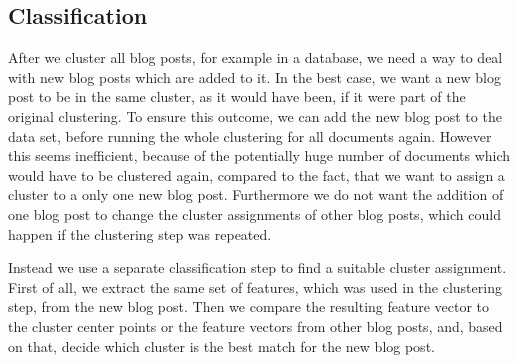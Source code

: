 
\subsection{Classification}
\label{sec:classification}



After we cluster all blog posts, for example in a database, we need a way to deal with new blog posts which are added to it.
In the best case, we want a new blog post to be in the same cluster, as it would have been, if it were part of the original clustering.
To ensure this outcome, we can add the new blog post to the data set, before running the whole clustering for all documents again.
However this seems inefficient, because of the potentially huge number of documents which would have to be clustered again, compared to the fact, that we want to assign a cluster to a only one new blog post.
Furthermore we do not want the addition of one blog post to change the cluster assignments of other blog posts, which could happen if the clustering step was repeated.


Instead we use a separate classification step to find a suitable cluster assignment.
First of all, we extract the same set of features, which was used in the clustering step, from the new blog post.
Then we compare the resulting feature vector to the cluster center points or the feature vectors from other blog posts, and, based on that, decide which cluster is the best match for the new blog post.